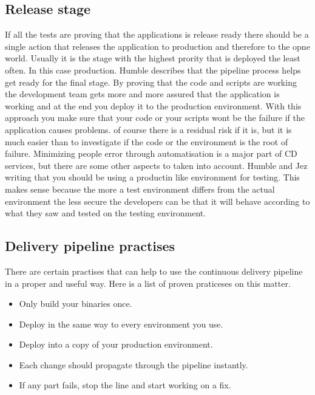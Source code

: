 \subsection{Release stage}
If all the tests are proving that the applications is release ready there should be a single action that releases the application to production and therefore
to the opne world. Usually it is the stage with the highest prority that is deployed the least often. In this case production. Humble describes that the pipeline
process helps get ready for the final stage. By proving that the code and scripts are working the development team gets more and more assured that the application
is working and at the end you deploy it to the production environment. With this approach you make sure that your code or your scripts wont be the failure if
the application causes problems. of course there is a residual risk if it is, but it is much easier than to investigate if the code or the environment is the
root of failure. Minimizing people error through automatisation is a major part of CD services, but there are some other aspects to taken into account. Humble and Jez writing
that you should be using a productin like environment for testing. This makes sense because the more a test environment differs from the actual environment
the less secure the developers can be that it will behave according to what they saw and tested on the testing environment.

\subsection{Delivery pipeline practises}
There are certain practises that can help to use the continuous delivery pipeline in a proper and useful way.
Here is a list of proven praticeses on this matter.

\begin{itemize}
  \item Only build your binaries once.
  \item Deploy in the same way to every environment you use.
  \item Deploy into a copy of your production environment.
  \item Each change should propagate through the pipeline instantly.
  \item If any part fails, stop the line and start working on a fix.
\end{itemize} \cite{humble2010continuous}

